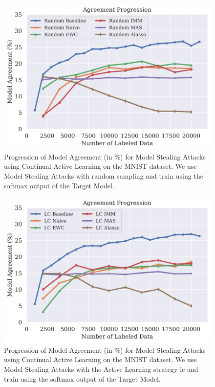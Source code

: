 \begin{figure}[h]
    \centering
    \includegraphics[width=0.7\linewidth]{images/results_CALMS/cifar100_softmax_random.png}
    \caption[Agreement Comparison for Model Stealing on CIFAR100 using the softmax output and the Active Learning strategy Random]{Progression of Model Agreement
    (in \%) for Model Stealing Attacks using Continual Active Learning on the MNIST dataset. We use Model Stealing Attacks with random sampling
    and train using the softmax output of the Target Model.}
    \label{fig:CALMSCIFAR100SoftmaxRandom}
\end{figure}

\begin{figure}[h]
    \centering
    \includegraphics[width=0.7\linewidth]{images/results_CALMS/cifar100_softmax_lc.png}
    \caption[Agreement Comparison for Model Stealing on CIFAR100 using the softmax output and the Active Learning strategy LC]{Progression of Model Agreement
    (in \%) for Model Stealing Attacks using Continual Active Learning on the MNIST dataset. We use Model Stealing Attacks with the Active Learning strategy
    \gls{lc} and train using the softmax output of the Target Model.}
    \label{fig:CALMSCIFAR100SoftmaxLC}
\end{figure}

